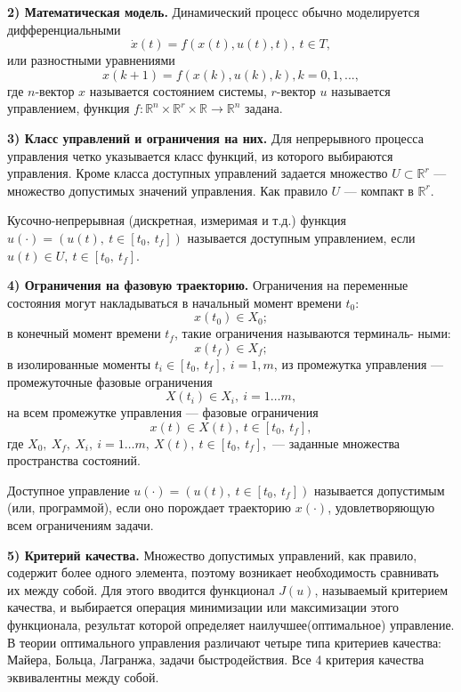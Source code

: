 \textbf{2) Математическая модель.} Динамический процесс обычно моделируется дифференциальными
\[ \dot x(t) = f(x(t), u(t), t), \ t\in T, \]
или разностными уравнениями
\[ x(k + 1) = f(x(k), u(k), k), k = 0, 1, ...,\]
где $n$-вектор $x$ называется состоянием системы, $r$-вектор $u$ называется управлением, функция $f : \mathbb{R}^n \times \mathbb{R}^r \times \mathbb{R} \to \mathbb{R}^n$ задана.


\textbf{3) Класс управлений и ограничения на них.} Для непрерывного
процесса управления четко указывается класс функций, из которого выбираются управления. Кроме класса доступных управлений задается множество $ U \subset \mathbb{R}^r $ --- множество допустимых значений управления. Как правило $U$ --- компакт в  $\mathbb{R}^r $.


\begin{definition}  Кусочно-непрерывная (дискретная, измеримая
и т.д.) функция $  u(\cdot) = (u(t),~ t \in [t_0,~ t_f])$ называется доступным управлением, если $u(t) \in U,~ t \in [t_0, ~t_f].$
\end{definition}


\textbf{4) Ограничения на фазовую траекторию. } Ограничения на переменные состояния могут накладываться в начальный момент времени $t_0$:
\[x(t_0) \in X_0;\]
в конечный момент времени $t_f$, такие ограничения называются терминаль-
ными:
\[x(t_f) \in X_f;\]
в изолированные моменты $t_i \in [t_0,~ t_f], ~i = 1, m$, из промежутка управления --- промежуточные фазовые ограничения
\[X(t_i) \in X_i, ~i = 1\dots m,\]
на всем промежутке управления --- фазовые ограничения
\[x(t) \in X(t), ~ t \in [t_0,~ t_f],\]
где $X_0,~ X_f,~ X_i, ~i = 1\dots m, ~X(t),~ t \in [t_0,~ t_f],$ --- заданные множества пространства состояний.


\begin{definition}   Доступное управление $  u(\cdot) = (u(t),~ t \in [t_0,~ t_f])$ называется допустимым (или, программой), если оно порождает траекторию $  x(\cdot) $, удовлетворяющую всем ограничениям задачи.
\end{definition}


\textbf{5) Критерий качества. }
Множество допустимых управлений, как правило, содержит более одного элемента, поэтому возникает необходимость сравнивать их между собой. Для этого вводится функционал $ J(u)$, называемый критерием качества, и выбирается операция минимизации или максимизации этого функционала, результат которой определяет наилучшее(оптимальное) управление.
В теории оптимального управления различают четыре типа критериев
качества: Майера, Больца, Лагранжа, задачи быстродействия. Все 4 критерия качества эквивалентны между собой.


